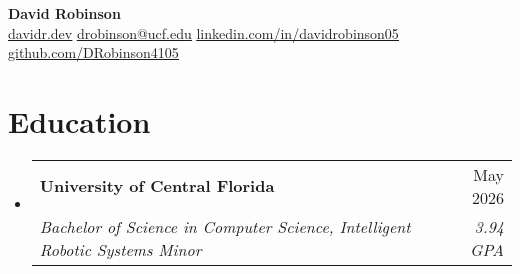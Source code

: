 \documentclass[letterpaper,11pt]{article}
\makeatletter
\newcommand{\resumeSubheading}[4]{
  \vspace{-2pt}\item
    \begin{tabular*}{0.97\textwidth}[t]{l@{\extracolsep{\fill}}r}
      \textbf{#1} & #2 \\
      \textit{\small#3} & \textit{\small #4} \\
    \end{tabular*}\vspace{-7pt}
}
\newcommand{\resumeSubHeadingListStart}{\begin{itemize}[leftmargin=0.15in, label={}]}
\newcommand{\resumeSubHeadingListEnd}{\end{itemize}}
\makeatother
\begin{document}
\begin{center}
  \textbf{\Huge David Robinson} \\ \vspace{2pt} \small
  \faCode\hspace{0.25pt} \href{https://www.davidr.dev/}{\uline{davidr.dev}}
  \faEnvelope\hspace{0.25pt} \href{mailto:drobinson@ucf.edu}{\uline{drobinson@ucf.edu}}
  \faLinkedin\hspace{0.25pt} \href{https://linkedin.com/in/davidrobinson05}{\uline{linkedin.com/in/davidrobinson05}}
  \faGithub\hspace{0.25pt} \href{https://github.com/DRobinson4105}{\uline{github.com/DRobinson4105}}
\end{center}

\section{Education}
  \resumeSubHeadingListStart
    \resumeSubheading
      {University of Central Florida}{May 2026}
      {Bachelor of Science in Computer Science, Intelligent Robotic Systems Minor}{3.94 GPA}
  \resumeSubHeadingListEnd

\vspace{-0.5em}
\end{document}
